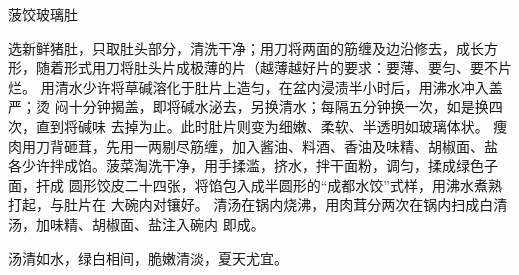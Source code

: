 \begin{recipe}{菠饺玻璃肚}

\ingredients


\preparation

\step 选新鲜猪肚，只取肚头部分，清洗干净；用刀将两面的筋缠及边沿修去，成长方
形，随着形式用刀将肚头片成极薄的片（越薄越好片的要求：要薄、要匀、要不片烂。
\step 用清水少许将草碱溶化于肚片上造匀，在盆内浸渍半小时后，用沸水冲入盖严；烫
闷十分钟揭盖，即将碱水泌去，另换清水；每隔五分钟换一次，如是换四次，直到将碱味
去掉为止。此时肚片则变为细嫩、柔软、半透明如玻璃体状。
\step 痩肉用刀背砸茸，先用一两剔尽筋缠，加入酱油、料酒、香油及味精、胡椒面、盐
各少许拌成馅。菠菜淘洗干净，用手揉滥，挤水，拌干面粉，调匀，揉成绿色子面，扞成
圆形饺皮二十四张，将馅包入成半圆形的“成都水饺”式样，用沸水煮熟打起，与肚片在
大碗内对镶好。
\step 清汤在锅内烧沸，用肉茸分两次在锅内扫成白清汤，加味精、胡椒面、盐注入碗内
即成。

\features

汤清如水，绿白相间，脆嫩清淡，夏天尤宜。

\end{recipe}

